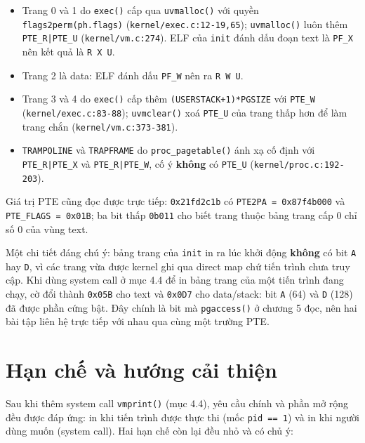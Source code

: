 \begin{itemize}[itemsep=0pt, topsep=2.5pt, leftmargin=1.5cm]
    \item Trang 0 và 1 do \texttt{exec()} cấp qua \texttt{uvmalloc()} với quyền \texttt{flags2perm(ph.flags)} (\texttt{kernel/exec.c:12-19,65}); \texttt{uvmalloc()} luôn thêm \texttt{PTE\_R|PTE\_U} (\texttt{kernel/vm.c:274}). ELF của \texttt{init} đánh dấu đoạn text là \texttt{PF\_X} nên kết quả là \texttt{R X U}.
    \item Trang 2 là data: ELF đánh dấu \texttt{PF\_W} nên ra \texttt{R W U}.
    \item Trang 3 và 4 do \texttt{exec()} cấp thêm \texttt{(USERSTACK+1)*PGSIZE} với \texttt{PTE\_W} (\texttt{kernel/exec.c:83-88}); \texttt{uvmclear()} xoá \texttt{PTE\_U} của trang thấp hơn để làm trang chắn (\texttt{kernel/vm.c:373-381}).
    \item \texttt{TRAMPOLINE} và \texttt{TRAPFRAME} do \texttt{proc\_pagetable()} ánh xạ cố định với \texttt{PTE\_R|PTE\_X} và \texttt{PTE\_R|PTE\_W}, cố ý \textbf{không} có \texttt{PTE\_U} (\texttt{kernel/proc.c:192-203}).
\end{itemize}

Giá trị PTE cũng đọc được trực tiếp: \texttt{0x21fd2c1b} có \texttt{PTE2PA = 0x87f4b000} và \texttt{PTE\_FLAGS = 0x01B}; ba bit thấp \texttt{0b011} cho biết trang thuộc bảng trang cấp 0 chỉ số 0 của vùng text.

Một chi tiết đáng chú ý: bảng trang của \texttt{init} in ra lúc khởi động \textbf{không} có bit \texttt{A} hay \texttt{D}, vì các trang vừa được kernel ghi qua direct map chứ tiến trình chưa truy cập. Khi dùng system call ở mục 4.4 để in bảng trang của một tiến trình đang chạy, cờ đổi thành \texttt{0x05B} cho text và \texttt{0x0D7} cho data/stack: bit \texttt{A} (64) và \texttt{D} (128) đã được phần cứng bật. Đây chính là bit mà \texttt{pgaccess()} ở chương 5 đọc, nên hai bài tập liên hệ trực tiếp với nhau qua cùng một trường PTE.

\section{Hạn chế và hướng cải thiện}

Sau khi thêm system call \texttt{vmprint()} (mục 4.4), yêu cầu chính và phần mở rộng đều được đáp ứng: in khi tiến trình được thực thi (mốc \texttt{pid == 1}) và in khi người dùng muốn (system call). Hai hạn chế còn lại đều nhỏ và có chủ ý:

